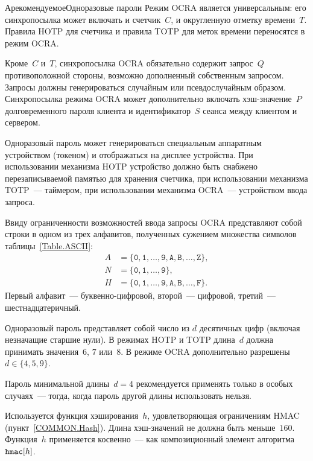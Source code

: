 \begin{appendix}{А}{рекомендуемое}{Одноразовые пароли}
Режим OCRA является универсальным:
его синхропосылка может включать и счетчик~$C$, и округленную 
отметку времени~$T$. Правила HOTP для счетчика
и правила TOTP для меток времени переносятся в режим OCRA.

Кроме~$C$ и~$T$, синхропосылка OCRA обязательно содержит запрос~$Q$ 
противоположной стороны, возможно дополненный собственным
запросом. 
%
Запросы должны генерироваться случайным или псевдослучайным образом.
%
Синхропосылка режима OCRA может дополнительно включать 
хэш-значение~$P$ долговременного пароля клиента
и идентификатор~$S$ сеанса между клиентом и сервером.

Одноразовый пароль может генерироваться специальным аппаратным 
устройством (токеном) и отображаться на дисплее устройства.
%
При использовании механизма HOTP устройство должно быть снабжено
перезаписываемой памятью для хранения счетчика,
при использовании механизма TOTP~--- таймером,
при использовании механизма OCRA~--- 
устройством ввода запроса.

Ввиду ограниченности возможностей ввода 
запросы OCRA представляют собой строки в одном из трех алфавитов,
полученных сужением множества символов таблицы~\ref{Table.ASCII}:
\begin{align*}
A&=\{
\texttt{0},\texttt{1},\ldots,\texttt{9},
\texttt{A},\texttt{B},\ldots,\texttt{Z}\},\\
N&=\{
\texttt{0},\texttt{1},\ldots,\texttt{9}\},\\
H&=\{
\texttt{0},\texttt{1},\ldots,\texttt{9},
\texttt{A},\texttt{B},\ldots,\texttt{F}\}.
\end{align*}
Первый алфавит~--- буквенно-цифровой,
второй~--- цифровой, третий~--- шестнадцатеричный.


Одноразовый пароль представляет собой число из $d$ десятичных цифр
(включая незначащие старшие нули).
%
В режимах HOTP и TOTP длина~$d$ должна принимать значения~$6$, $7$ или~$8$.
В режиме OCRA дополнительно разрешены~$d\in\{4,5,9\}$. 

Пароль минимальной длины~$d=4$ рекомендуется применять 
только в особых случаях~--- тогда, когда пароль другой длины 
использовать нельзя.


Используется функция хэширования~$h$,
удовлетворяющая ограничениям HMAC (пункт~\ref{COMMON.Hash}).
Длина хэш-значений не должна быть меньше~$160$.
%
Функция~$h$ применяется косвенно~--- как композиционный элемент
алгоритма~$\texttt{hmac}[h]$.


\end{appendix}
